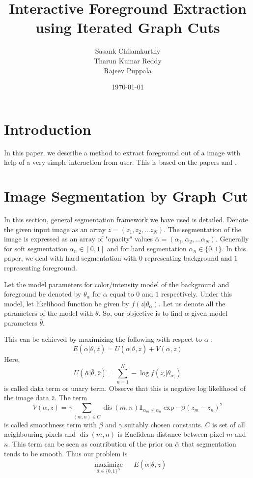 \documentclass[a4paper]{article}
\begin{document}
\title{Interactive Foreground Extraction using Iterated Graph Cuts}
\author{Sasank Chilamkurthy\\Tharun Kumar Reddy\\Rajeev Puppala}
\date{\today}
\maketitle

\section{Introduction}
In this paper, we describe a method to extract foreground out of a image with help of a very simple interaction from user. This is based on the papers \cite{1} and \cite{2}.

\section{Image Segmentation by Graph Cut}
In this section, general segmentation framework we have used is detailed. Denote the given input image as an array $\bar{z} = (z_1, z_2, \dots z_N)$. 
The segmentation of the image is expressed as an array of "opacity" values $\bar{\alpha} = (\alpha_1, \alpha_2, \dots \alpha_N)$. 
Generally for soft segmentation  $\alpha_n \in [0,1]$ and for hard segmentation $\alpha_n \in \{0,1\}$. 
In this paper, we deal with hard segmentation with $0$ representing background and $1$ representing foreground.

Let the model parameters for color/intensity model of the background and foreground be denoted by $\theta_\alpha$ for $\alpha$ equal to $0$ and $1$ respectively. 
Under this model, let likelihood function be given by $f(z|\theta_\alpha)$. Let us denote all the parameters of the model with $\bar{\theta}$.
So, our objective is to find $\bar{\alpha}$ given model parameters $\bar{\theta}$.

This can be achieved by maximizing the following with respect to $\bar{\alpha}$ :
\[ 
E(\bar{\alpha}| \bar{\theta},\bar{z} ) = U(\bar{\alpha}| \bar{\theta},\bar{z}) + V(\bar{\alpha},\bar{z})
\]
Here, 
\[
U(\bar{\alpha}| \bar{\theta},\bar{z}) = \sum_{n=1}^N -\log f(z_i | \theta_{\alpha_i})
\] 
is called data term or unary term. Observe that this is negative log likelihood of the image data $\bar{z}$. The term
\[
V(\bar{\alpha},\bar{z}) = \gamma \sum_{(m,n) \in C} \operatorname{dis}(m,n) \mathbf{1}_{\alpha_m \neq \alpha_n} \exp{-\beta(z_m-z_n)^2}
\]
is called smoothness term with $\beta$ and $\gamma$ suitably chosen constants. $C$ is set of all neighbouring pixels and $\operatorname{dis}(m,n)$ is Euclidean distance between pixel $m$ and $n$.  
This term can be seen as contribution of the prior on $\bar{\alpha}$ that segmentation tends to be smooth. Thus our problem is 
\begin{equation}
\begin{aligned}
& \underset{\bar{\alpha}\in\{0,1 \}^N}{\text{maximize}}
& & E(\bar{\alpha}| \bar{\theta},\bar{z} )
\end{aligned}
\end{equation}
\end{document}

